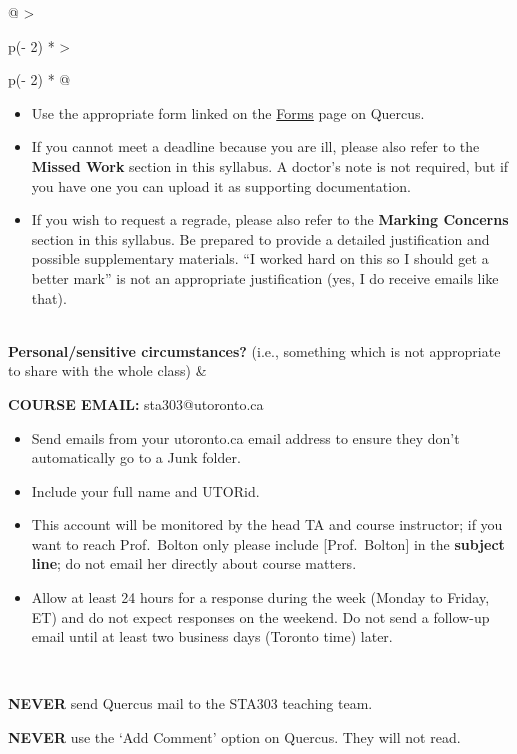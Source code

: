 \documentclass[
  openany]{book}
\begin{document}
\begin{longtable}[]{@{}
  >{\raggedright\arraybackslash}p{(\columnwidth - 2\tabcolsep) * }
  >{\raggedright\arraybackslash}p{(\columnwidth - 2\tabcolsep) * }@{}}
\begin{minipage}[t]{\linewidth}
\begin{itemize}
\item
  Use the appropriate form linked on the \href{https://q.utoronto.ca/courses/253305/pages/forms}{Forms} page on Quercus.
\item
  If you cannot meet a deadline because you are ill, please also refer to the \textbf{Missed Work} section in this syllabus. A doctor's note is not required, but if you have one you can upload it as supporting documentation.
\item
  If you wish to request a regrade, please also refer to the \textbf{Marking Concerns} section in this syllabus. Be prepared to provide a detailed justification and possible supplementary materials. ``I worked hard on this so I should get a better mark'' is not an appropriate justification (yes, I do receive emails like that).
\end{itemize}
\end{minipage} \\
\textbf{Personal/sensitive circumstances?} (i.e., something which is not appropriate to share with the whole class) & \begin{minipage}[t]{\linewidth}\raggedright
\textbf{COURSE EMAIL:} sta303@utoronto.ca

\begin{itemize}
\item
  Send emails from your utoronto.ca email address to ensure they don't automatically go to a Junk folder.
\item
  Include your full name and UTORid.
\item
  This account will be monitored by the head TA and course instructor; if you want to reach Prof.~Bolton only please include {[}Prof.~Bolton{]} in the \textbf{subject line}; do not email her directly about course matters.
\item
  Allow at least 24 hours for a response during the week (Monday to Friday, ET) and do not expect responses on the weekend. Do not send a follow-up email until at least two business days (Toronto time) later.
\end{itemize}
\end{minipage} \\
\bottomrule
\end{longtable}

\textbf{NEVER} send Quercus mail to the STA303 teaching team.

\textbf{NEVER} use the `Add Comment' option on Quercus. They will not read.
\end{document}
